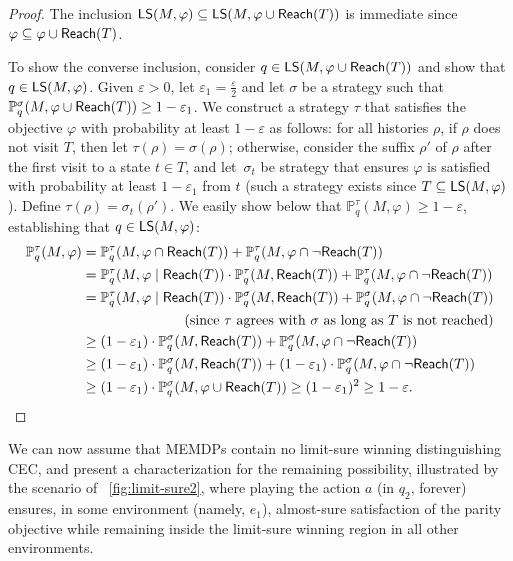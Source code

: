 \documentclass[a4paper,USenglish,cleveref, autoref, thm-restate]{lipics-v2021}
\let\epsilon\varepsilon
\newcommand*{\pr}{\mathbb{P}}
\newcommand\limitsure{\textrm{\sf LS}}
\newcommand\Reach{\textrm{\sf Reach}}
\begin{document}
\begin{proof}
	The inclusion $\limitsure(M, \varphi) \subseteq \limitsure(M, \varphi \cup \Reach(T))$
	is immediate since $\varphi \subseteq \varphi \cup \Reach(T)$.

	To show the converse inclusion, consider $q \in \limitsure(M, \varphi \cup \Reach(T))$
	and show that $q\in \limitsure(M, \varphi)$. 
	Given $\epsilon > 0$, let $\epsilon_1 = \frac{\epsilon}{2}$ and
	let $\sigma$ be a strategy such that 
	$\pr_{q}^{\sigma}(M, \varphi \cup \Reach(T)) \geq 1-\epsilon_1$.
	We construct a strategy $\tau$ that satisfies the objective $\varphi$ 
	with probability at least $1-\epsilon$ as follows:
	for all histories $\rho$, if $\rho$ does not visit $T$, then let $\tau(\rho) = \sigma(\rho)$;
	otherwise, consider the suffix $\rho'$ of $\rho$ after the first visit to a state $t \in T$, 
	and let~$\sigma_t$ be strategy that ensures $\varphi$ is satisfied with probability 
	at least $1-\epsilon_1$ from $t$ (such a strategy exists since $T \subseteq \limitsure(M, \varphi)$).
	Define $\tau(\rho) = \sigma_t(\rho')$.
	We easily show below that $\pr_{q}^{\tau}(M, \varphi) \geq 1-\epsilon$, 
	establishing that $q\in \limitsure(M, \varphi)$:
	\begin{align*}
	\pr_{q}^{\tau}(M, \varphi) & = \pr_{q}^{\tau}(M, \varphi \cap \Reach(T)) + \pr_{q}^{\tau}(M, \varphi \cap \lnot \Reach(T)) \\
	& = \pr_{q}^{\tau}(M, \varphi \mid \Reach(T)) \cdot \pr_{q}^{\tau}(M, \Reach(T)) 
	+ \pr_{q}^{\tau}(M, \varphi \cap \lnot \Reach(T)) \\
	& = \pr_{q}^{\tau}(M, \varphi \mid \Reach(T)) \cdot \pr_{q}^{\sigma}(M, \Reach(T)) 
	+ \pr_{q}^{\sigma}(M, \varphi \cap \lnot \Reach(T)) \\
	& \qquad\qquad\qquad\quad\  \text{(since $\tau$ agrees with $\sigma$ as long as $T$ is not reached)} \\
	& \geq (1-\epsilon_1)  \cdot \pr_{q}^{\sigma}(M, \Reach(T)) 
	+ \pr_{q}^{\sigma}(M, \varphi \cap \lnot \Reach(T)) \\
	& \geq (1-\epsilon_1)  \cdot \pr_{q}^{\sigma}(M, \Reach(T)) 
	+ (1-\epsilon_1)  \cdot \pr_{q}^{\sigma}(M, \varphi \cap \lnot \Reach(T)) \\
	& \geq (1-\epsilon_1)  \cdot \pr_{q}^{\sigma}(M, \varphi \cup \Reach(T)) \geq (1-\epsilon_1)^2   \geq 1-\epsilon.
	\end{align*}
\end{proof}

We can now assume that MEMDPs contain no limit-sure winning distinguishing CEC,
and present a characterization for the remaining possibility, illustrated by the scenario of 
\figurename~\ref{fig:limit-sure2}, where playing the action $a$ (in $q_2$, forever) 
ensures, in some environment (namely, $e_1$), almost-sure satisfaction of 
the parity objective while remaining inside the limit-sure winning region in all other environments. 
\end{document}
